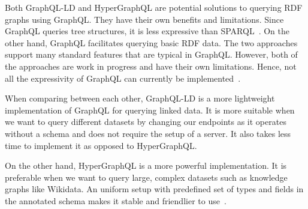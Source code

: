 Both GraphQL-LD and HyperGraphQL are potential solutions to querying RDF graphs using GraphQL. They have their own benefits and limitations. Since GraphQL queries tree structures, it is less expressive than SPARQL~\cite{Werbrouck2019}. On the other hand, GraphQL facilitates querying basic RDF data. The two approaches support many standard features that are typical in GraphQL. However, both of the approaches are work in progress and have their own limitations. Hence, not all the expressivity of GraphQL can currently be implemented~\cite{Werbrouck2019}.

When comparing between each other, GraphQL-LD is a more lightweight implementation of GraphQL for querying linked data. It is more suitable when we want to query different datasets by changing our endpoints as it operates without a schema and does not require the setup of a server. It also takes less time to implement it as opposed to HyperGraphQL.

On the other hand, HyperGraphQL is a more powerful implementation. It is preferable when we want to query large, complex datasets such as knowledge graphs like Wikidata. An uniform setup with predefined set of types and fields in the annotated schema makes it stable and friendlier to use~\cite{Werbrouck2019a}. 

